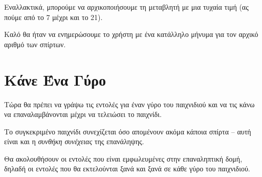 \documentclass[a4paper,11pt,oneside]{book}
\begin{document}
Εναλλακτικά, μπορούμε να αρχικοποιήσουμε τη μεταβλητή  με μια τυχαία τιμή (ας πούμε από το 7 μέχρι και το 21).



Καλό θα ήταν να ενημερώσουμε το χρήστη με ένα κατάλληλο μήνυμα για τον αρχικό αριθμό των σπίρτων.



\section{Κάνε Ένα Γύρο}

\begin{question}
Τώρα θα πρέπει να γράψω τις εντολές για έναν γύρο του παιχνιδιού και να τις κάνω να επαναλαμβάνονται μέχρι να τελειώσει το παιχνίδι.
\end{question}

Το συγκεκριμένο παιχνίδι συνεχίζεται όσο απομένουν ακόμα κάποια σπίρτα -- αυτή είναι και η \emph{συνθήκη συνέχειας} της επανάληψης.


Θα ακολουθήσουν οι εντολές που είναι εμφωλευμένες στην επαναληπτική δομή, δηλαδή οι εντολές που θα εκτελούνται ξανά και ξανά σε κάθε γύρο του παιχνιδιού.

\end{document}
